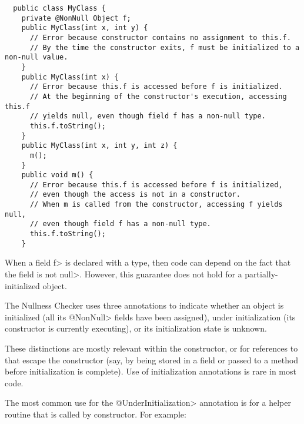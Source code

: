 \begin{Verbatim}
  public class MyClass {
    private @NonNull Object f;
    public MyClass(int x, int y) {
      // Error because constructor contains no assignment to this.f.
      // By the time the constructor exits, f must be initialized to a non-null value.
    }
    public MyClass(int x) {
      // Error because this.f is accessed before f is initialized.
      // At the beginning of the constructor's execution, accessing this.f
      // yields null, even though field f has a non-null type.
      this.f.toString();
    }
    public MyClass(int x, int y, int z) {
      m();
    }
    public void m() {
      // Error because this.f is accessed before f is initialized,
      // even though the access is not in a constructor.
      // When m is called from the constructor, accessing f yields null,
      // even though field f has a non-null type.
      this.f.toString();
    }
\end{Verbatim}

\noindent
When a field \<f> is declared with a 
type, then code can depend on the fact that the field is not \<null>.
However, this guarantee does not hold for a partially-initialized object.

The Nullness Checker uses three annotations to indicate whether an object
is initialized (all its \<@NonNull> fields have been assigned), under
initialization (its constructor is currently executing), or its
initialization state is unknown.

These distinctions are mostly relevant within the constructor, or for
references to  that escape the constructor (say, by being stored
in a field or passed to a method before initialization is complete).
Use of initialization annotations is rare in most code.

\label{underinitialization-examples}

The most common use for the \<@UnderInitialization> annotation is for a
helper routine that is called by constructor.  For example:

